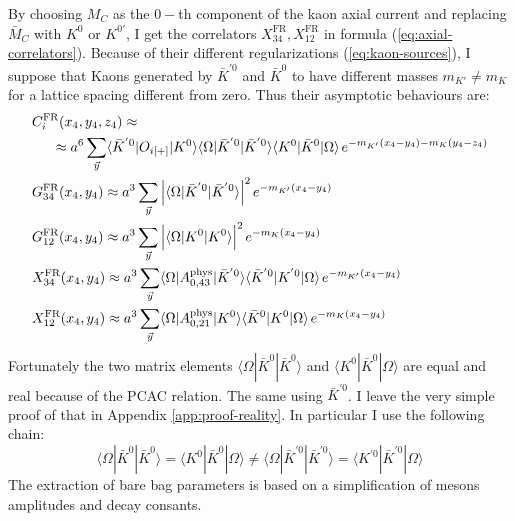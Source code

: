 \documentclass[english, LaM, oneside, noexaminfo]{sapthesis}
\newcommand{\la}{\langle}
\newcommand{\ra}{\rangle}
\begin{document}
By choosing $M_C$ as the $0-$th component of the kaon axial current and replacing $\bar M_C$ with $K^0$ or $K^{0'}$, I get the correlators $X_{34}^\text{FR}, X_{12}^\text{FR}$ in formula (\ref{eq:axial-correlators}).
Because of their different regularizations (\ref{eq:kaon-sources}), I suppose that Kaons generated by $\bar K^{'0}$ and $\bar K^{0}$ to have different masses $m_{K'} \neq m_K$ for a lattice spacing different from zero.
Thus their asymptotic behaviours are:
\begin{equation*}
    \begin{split}
        & C_i^\text{FR}(x_4,y_4,z_4)\approx \\
        & \hspace*{5mm} \approx a^6\sum_{\vec y} \la \bar K^{'0} | O_{i[+]} | K^0 \ra  \la \Omega | \bar K^{'0} | \bar K^{'0} \ra  \la K^0 | \bar K^0 | \Omega \ra \hspace*{.5mm} e^{-m_{K'}(x_4-y_4)-m_K(y_4-z_4)}  \\
        & G_{34}^\text{FR}(x_4,y_4) \approx a^3\sum_{\vec y} \Big| \la \Omega | \bar K^{'0} | \bar K^{'0} \ra \Big|^2 \hspace*{.5mm} e^{-m_{K'}(x_4-y_4)} \\
        & G_{12}^\text{FR}(x_4,y_4) \approx a^3\sum_{\vec y} \Big| \la \Omega |  K^0 |  K^0 \ra \Big|^2 \hspace*{.5mm} e^{-m_K(x_4-y_4)} \\
        & X_{34}^\text{FR}(x_4,y_4) \approx a^3\sum_{\vec y} \la \Omega | A_{0,43}^\text{phys} | \bar K^{'0} \ra \la \bar K^{'0} | K^{'0} | \Omega \ra \hspace*{.5mm} e^{-m_{K'}(x_4-y_4)} \\
        & X_{12}^\text{FR}(x_4,y_4) \approx a^3\sum_{\vec y} \la \Omega | A_{0,21}^\text{phys} | K^0 \ra \la \bar K^0 | K^0 | \Omega \ra \hspace*{.5mm} e^{-m_K(x_4-y_4)} \\
    \end{split}
\end{equation*}
Fortunately the two matrix elements $\la \Omega | \bar K^0 | \bar K^0 \ra$ and $\la K^0 | \bar K^0 | \Omega \ra$ are equal and real because of the PCAC relation.
The same using $\bar K^{'0}$.
I leave the very simple proof of that in Appendix \ref{app:proof-reality}.
In particular I use the following chain:
$$\la \Omega | \bar K^0 | \bar K^0 \ra = \la K^0 | \bar K^0 | \Omega \ra \neq \la \Omega | \bar K^{'0} | \bar K^{'0} \ra = \la K^{'0} | \bar K^{'0} | \Omega \ra$$
The extraction of bare bag parameters is based on a simplification of mesons amplitudes and decay consants.
\end{document}
